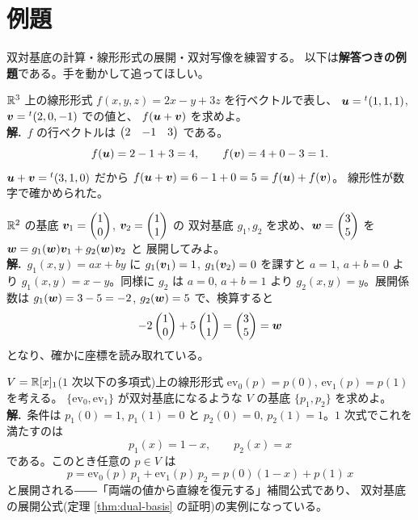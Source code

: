 \section{例題}

双対基底の計算・線形形式の展開・双対写像を練習する。
以下は\textbf{解答つきの例題}である。手を動かして追ってほしい。

\begin{rei}[例題・基本(行ベクトル表示)]\label{rei:dual-calc}
$\mathbb{R}^3$ 上の線形形式 $f(x, y, z) = 2x - y + 3z$ を行ベクトルで表し、
$\bm{u} = {}^t(1, 1, 1)$, $\bm{v} = {}^t(2, 0, -1)$ での値と、
$f(\bm{u} + \bm{v})$ を求めよ。\\
\textbf{解.}\ $f$ の行ベクトルは $\begin{pmatrix}2 & -1 & 3\end{pmatrix}$ である。
\[
f(\bm{u}) = 2 - 1 + 3 = 4, \qquad f(\bm{v}) = 4 + 0 - 3 = 1.
\]
$\bm{u} + \bm{v} = {}^t(3, 1, 0)$ だから
$f(\bm{u} + \bm{v}) = 6 - 1 + 0 = 5 = f(\bm{u}) + f(\bm{v})$。
線形性が数字で確かめられた。
\end{rei}

\begin{rei}[例題・基本(双対基底の計算)]\label{rei:dual-basis2}
$\mathbb{R}^2$ の基底 $\bm{v}_1 = \begin{pmatrix}1 \\ 0\end{pmatrix}$, $\bm{v}_2 = \begin{pmatrix}1 \\ 1\end{pmatrix}$ の
双対基底 $g_1, g_2$ を求め、$\bm{w} = \begin{pmatrix}3 \\ 5\end{pmatrix}$ を
$\bm{w} = g_1(\bm{w})\bm{v}_1 + g_2(\bm{w})\bm{v}_2$ と
展開してみよ。\\
\textbf{解.}\ $g_1(x, y) = ax + by$ に $g_1(\bm{v}_1) = 1$,
$g_1(\bm{v}_2) = 0$ を課すと $a = 1$, $a + b = 0$ より
$g_1(x, y) = x - y$。同様に $g_2$ は $a = 0$, $a + b = 1$ より
$g_2(x, y) = y$。展開係数は
$g_1(\bm{w}) = 3 - 5 = -2$, $g_2(\bm{w}) = 5$ で、検算すると
\[
-2\begin{pmatrix}1 \\ 0\end{pmatrix} + 5\begin{pmatrix}1 \\ 1\end{pmatrix} = \begin{pmatrix}3 \\ 5\end{pmatrix} = \bm{w}
\]
となり、確かに座標を読み取れている。
\end{rei}

\begin{rei}[例題・基本(多項式の空間で)]\label{rei:dual-poly}
$V = \mathbb{R}[x]_1$($1$ 次以下の多項式)上の線形形式
$\mathrm{ev}_0(p) = p(0)$, $\mathrm{ev}_1(p) = p(1)$ を考える。
$\{\mathrm{ev}_0, \mathrm{ev}_1\}$ が双対基底になるような $V$ の基底
$\{p_1, p_2\}$ を求めよ。\\
\textbf{解.}\ 条件は $p_1(0) = 1$, $p_1(1) = 0$ と
$p_2(0) = 0$, $p_2(1) = 1$。$1$ 次式でこれを満たすのは
\[
p_1(x) = 1 - x, \qquad p_2(x) = x
\]
である。このとき任意の $p \in V$ は
\[
p = \mathrm{ev}_0(p)\,p_1 + \mathrm{ev}_1(p)\,p_2
= p(0)(1 - x) + p(1)\,x
\]
と展開される――「両端の値から直線を復元する」補間公式であり、
双対基底の展開公式(定理 \ref{thm:dual-basis} の証明)の実例になっている。
\end{rei}

